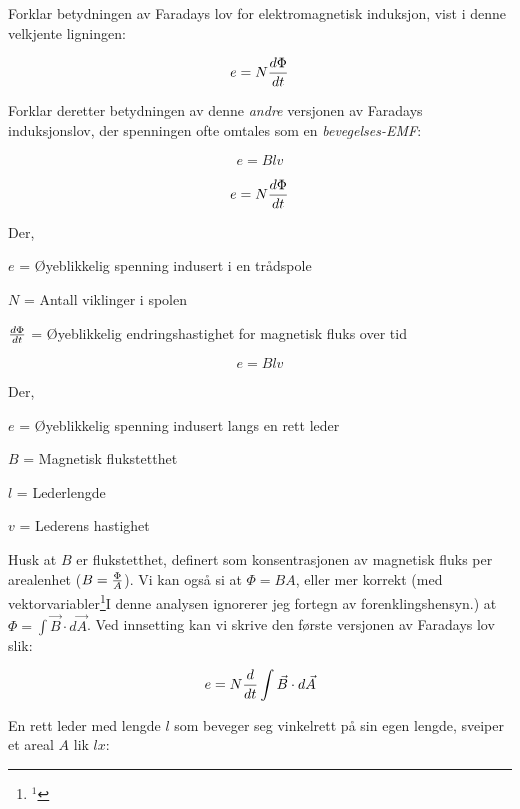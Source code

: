 

Forklar betydningen av Faradays lov for elektromagnetisk induksjon, vist i denne velkjente ligningen:

$$e = N {d \Phi \over dt}$$

Forklar deretter betydningen av denne \textit{andre} versjonen av Faradays induksjonslov, der spenningen ofte omtales som en \textit{bevegelses-EMF}:

$$e = Blv$$







$$e = N {d \Phi \over dt}$$

\noindent
Der,

$e$ = Øyeblikkelig spenning indusert i en trådspole

$N$ = Antall viklinger i spolen

$d \Phi \over dt$ = Øyeblikkelig endringshastighet for magnetisk fluks over tid

\vskip 20pt

$$e = Blv$$

\noindent
Der,

$e$ = Øyeblikkelig spenning indusert langs en rett leder

$B$ = Magnetisk flukstetthet

$l$ = Lederlengde

$v$ = Lederens hastighet







Husk at $B$ er flukstetthet, definert som konsentrasjonen av magnetisk fluks per arealenhet ($B = {\Phi \over A}$). Vi kan også si at $\Phi = B A$, eller mer korrekt (med vektorvariabler\footnote{$^{1}$}{I denne analysen ignorerer jeg fortegn av forenklingshensyn.}) at $\Phi = \int \vec B \cdot d \vec A$. Ved innsetting kan vi skrive den første versjonen av Faradays lov slik:

$$e = N {d \over dt} \int \vec B \cdot d \vec A$$

En rett leder med lengde $l$ som beveger seg vinkelrett på sin egen lengde, sveiper et areal $A$ lik $lx$:

